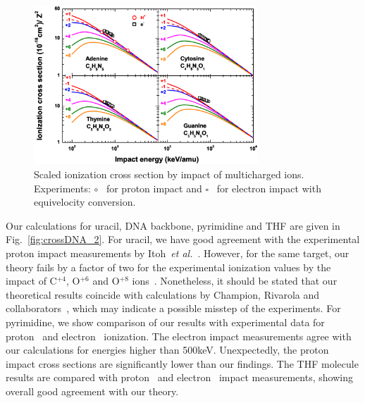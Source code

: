 \documentclass[preprint,12pt]{article}
\begin{document}
\begin{figure}[t!]
\centering
\includegraphics[width=0.75\textwidth]{figuras/Fig_finales/fig2.eps}
\caption{Scaled ionization cross section by impact of multicharged ions. 
Experiments: 
$\circ$~\cite{iriki2011} for proton impact and $\square$~\cite{rahman2016} 
for electron impact with equivelocity conversion.}
\label{fig:crossDNA_1}
\end{figure} 

Our calculations for uracil, DNA backbone, pyrimidine and THF are given in 
Fig.~\ref{fig:crossDNA_2}. 
For uracil, we have good agreement with the experimental 
proton impact measurements by Itoh~{\it et al.}~\cite{itoh2013}. 
However, for the same target, our theory fails by a factor of two for 
the experimental ionization values by the impact of 
C$^{+4}$, O$^{+6}$ and O$^{+8}$ ions~\cite{agnihotri2012,agnihotri2013}.
Nonetheless, it should be stated that our theoretical results coincide 
with calculations by Champion, Rivarola and 
collaborators~\cite{agnihotri2012,champion2012}, which may indicate a 
possible misstep of the experiments. 
For pyrimidine, we show comparison of our results with experimental data
for proton~\cite{wolff2014} and electron~\cite{bug2017} ionization. 
The electron impact measurements 
agree with our calculations for energies higher than 500keV. 
Unexpectedly, the proton impact cross sections are significantly lower 
than our findings. 
The THF molecule results are compared with proton~\cite{wang2016} 
and electron~\cite{bug2017,wolf2019,fuss2009} impact measurements, showing
overall good agreement with our theory. 
\end{document}
